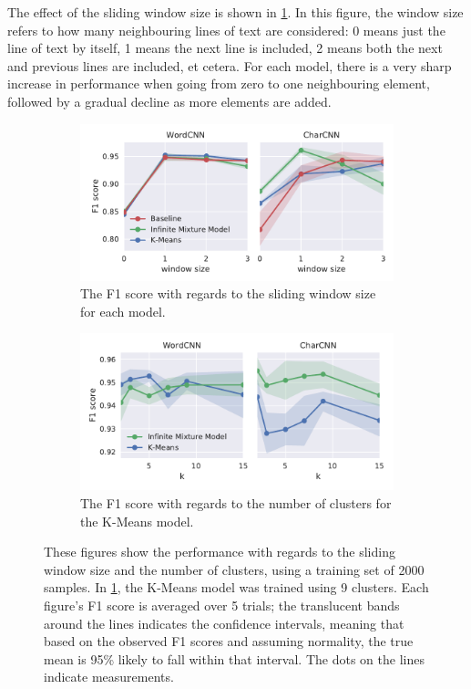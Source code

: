 The effect of the sliding window size is shown in \cref{fig:window}. In this
figure, the window size refers to how many neighbouring lines of text are
considered: 0 means just the line of text by itself, 1 means the next line is
included, 2 means both the next and previous lines are included, et cetera.
For each model, there is a very sharp increase in performance when going from
zero to one neighbouring element, followed by a gradual decline as more elements
are added.
\begin{figure}[p]
  \centering
  \begin{subfigure}[b]{\textwidth}
    \includegraphics[width=\textwidth]{figures/results/2000-windowsize_forward-old/tseries_f1.pdf}
    \caption{The F1 score with regards to the sliding window size for each
    model.\label{fig:window}}
    \vspace*{\fill}
  \end{subfigure}
  \begin{subfigure}[b]{\textwidth}
    \includegraphics[width=\textwidth]{figures/results/2000-numclusters-old/tseries_f1.pdf}
    \caption{The F1 score with regards to the number of clusters for the K-Means
      model.\label{fig:numcluster}}
  \end{subfigure}
  \caption{These figures show the performance with regards to the sliding window
    size and the number of clusters, using a training set of 2000 samples. In
    \cref{fig:window}, the K-Means model was trained using 9 clusters.
    Each figure's F1 score is averaged over 5 trials; the translucent bands
    around the lines indicates the confidence intervals, meaning that based on
    the observed F1 scores and assuming normality, the true mean is 95\% likely
    to fall within that interval. The dots on the lines indicate
    measurements.\label{fig:params}
  }
\end{figure}

